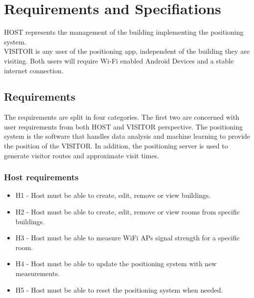 \chapter{Requirements and Specifiations}
HOST represents the management of the building implementing the positioning system.\\ 
VISITOR is any user of the positioning app, independent of the building they are visiting.
Both users will require Wi-Fi enabled Android Devices and a stable internet connection. 

\section{Requirements}
The requirements are split in four categories. The first two are concerned with user requirements from both HOST and VISITOR perspective. The positioning system is the software that handles data analysis and machine learning to provide the position of the VISITOR. In addition, the positioning server is used to generate visitor routes and approximate visit times.

\subsection{Host requirements}
	\begin{itemize}
		\item H1 - Host must be able to create, edit, remove or view buildings.
		\item H2 - Host must be able to create, edit, remove or view rooms from specific buildings.
		\item H3 - Host must be able to measure WiFi APs signal strength for a specific room.
		\item H4 - Host must be able to update the positioning system with new measurements.
		\item H5 - Host must be able to reset the positioning system when needed.
	\end{itemize}

